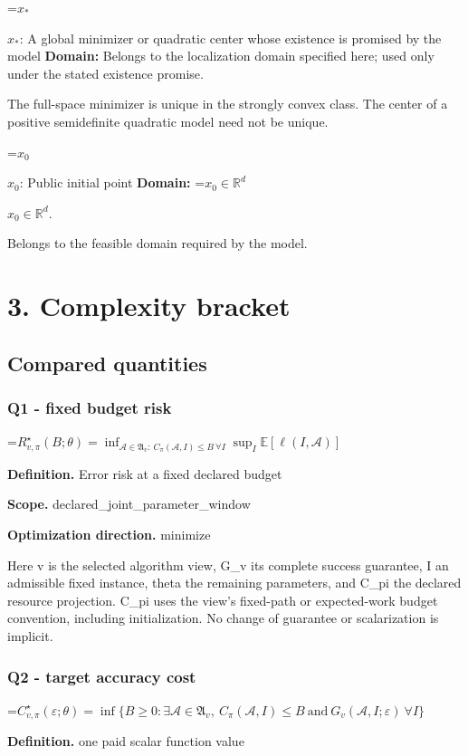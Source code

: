 \documentclass[10pt,a4paper]{article}
\newcommand{\AtlasMath}[1]{\par\begingroup\centering\setbox0=\hbox{$\displaystyle #1$}\ifdim\wd0>1.4\linewidth\typeout{ATLAS WIDE FORMULA: \the\wd0}\fi\ifdim\wd0>\linewidth\resizebox{\linewidth}{!}{\box0}\else\box0\fi\par\endgroup}
\newcommand{\AtlasInlineMath}[1]{\begingroup\setbox0=\hbox{$#1$}\ifdim\wd0>.4\linewidth\endgroup\AtlasMath{#1}\else\endgroup$#1$\fi}
\begin{document}
\AtlasInlineMath{x_*}: A global minimizer or quadratic center whose existence is promised by the model \textbf{Domain:} Belongs to the localization domain specified here; used only under the stated existence promise.

The full-space minimizer is unique in the strongly convex class. The center of a positive semidefinite quadratic model need not be unique.

\AtlasInlineMath{x_0}: Public initial point \textbf{Domain:} \AtlasInlineMath{x_0\in\mathbb{R}^d}.

Belongs to the feasible domain required by the model.

\section{3. Complexity bracket}
\subsection{Compared quantities}
\subsubsection{Q1 - fixed budget risk}
\AtlasMath{R^\star_{v,\pi}(B;\theta)=\inf_{\mathcal A\in\mathfrak A_v:\ C_\pi(\mathcal A,I)\le B\ \forall I}\sup_I\mathbb E[\ell(I,\mathcal A)]}
\textbf{Definition.} Error risk at a fixed declared budget

\textbf{Scope.} declared\_joint\_parameter\_window

\textbf{Optimization direction.} minimize

Here v is the selected algorithm view, G\_v its complete success guarantee, I an admissible fixed instance, theta the remaining parameters, and C\_pi the declared resource projection. C\_pi uses the view's fixed-path or expected-work budget convention, including initialization. No change of guarantee or scalarization is implicit.

\subsubsection{Q2 - target accuracy cost}
\AtlasMath{C^\star_{v,\pi}(\varepsilon;\theta)=\inf\{B\ge0:\exists\mathcal A\in\mathfrak A_v,\ C_\pi(\mathcal A,I)\le B\ \text{and}\ G_v(\mathcal A,I;\varepsilon)\ \forall I\}}
\textbf{Definition.} one paid scalar function value
\end{document}
